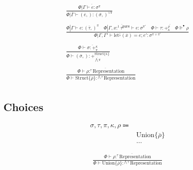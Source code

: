 \documentclass {article}
\begin{document}
\begin{gather*}
\frac
{\Phi | \overline { \Gamma \vdash e : \sigma^\pi }}
{\Phi | \overline \Gamma  \vdash (\overline e,) : (\overline \sigma,)^{\lor \pi} } \\
\\
\frac
{\Phi | \Gamma \vdash e : (\overline \tau,)^\pi
\quad \Phi | \Gamma , \overline {x :^1 \tau^\texttt{pure}} \vdash e : \sigma^{\pi'} \quad
\overline {\Phi \vdash \tau : +^\rho_\kappa \quad \Phi \Vdash^\bullet \rho}}
{\Phi | \Gamma, \Gamma' \vdash \text{let}^\downarrow (\overline x) = e; e' : \sigma^{\pi \lor \pi'}} \\
\\
\frac
{\Phi \vdash \overline {\sigma : +^\kappa_\pi}}
{\Phi \vdash (\overline \sigma,) : +^{\text{Struct} \{\overline \kappa\}}_{\overline {\bigwedge \pi}}} \\
\\
\frac
{\Phi \vdash \overline {\rho :^\tau \text{Representation}}}
{\Phi \vdash \text{Struct} \{ \overline \rho \} :^{\bigwedge \tau} \text{Representation} } \\
\end{gather*}

\subsection{Choices}
\begin{align*}
\sigma, \tau, \pi, \kappa, \rho \Coloneqq & \\
& \text{Union} \{ \overline \rho \} \tag{Union Representation} \\
& \dots
\end{align*}

\begin{gather*}
\frac
{\Phi \vdash \overline {\rho :^\tau \text{Representation}}}
{\Phi \vdash \text{Union} \{ \overline \rho \} :^{\bigwedge \tau} \text{Representation} } \\
\end{gather*}
\end{document}
